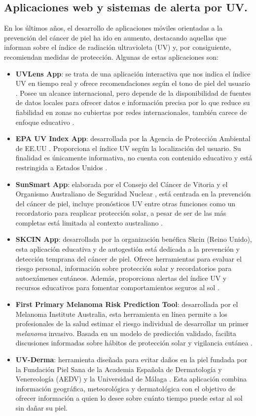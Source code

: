 \subsection{Aplicaciones web y sistemas de alerta por UV.}
En los últimos años, el desarrollo de aplicaciones móviles orientadas a la prevención del cáncer de piel ha ido en aumento, destacando aquellas que informan sobre el índice de radiación ultravioleta (UV) y, por consiguiente, recomiendan medidas de protección.
Algunas de estas aplicaciones son:
\begin{itemize}
    \item \textbf{UVLens App}:  se trata de una aplicación interactiva que nos indica el índice UV en tiempo real y ofrece recomendaciones según el tono de piel del usuario \cite{UVLensKeepingYou}. Posee un alcance internacional, pero depende de la disponibilidad de fuentes de datos locales para ofrecer datos e información precisa por lo que reduce su fiabilidad en zonas no cubiertas por redes internacionales, también carece de enfoque educativo .
    \item \textbf{EPA UV Index App}: desarrollada por la Agencia de Protección Ambiental de EE.UU \cite{usepaUSEnvironmentalProtection2013}. Proporciona el índice UV según la localización del usuario. Su finalidad es únicamente informativa, no cuenta con contenido educativo y está restringida a Estados Unidos  \cite{usepaUVIndex2023}.
    \item \textbf{SunSmart App}: elaborada por el Consejo del Cáncer de Vitoria y el Organismo Australiano de Seguridad Nuclear \cite{AplicacionSunSmartGlobal}, está centrada en la prevención del cáncer de piel, incluye pronósticos UV entre otras funciones como un recordatorio para reaplicar protección solar, a pesar de ser de las más completas está limitada al contexto australiano \cite{sunsmartHomePageMeta}.
    \item \textbf{SKCIN App}: desarrollada por la organización benéfica Skcin (Reino Unido), esta aplicación educativa y de autogestión está dedicada a la prevención y detección temprana del cáncer de piel. Ofrece herramientas para evaluar el riesgo personal, información sobre protección solar y recordatorios para autoexámenes cutáneos. Además, proporciona alertas del índice UV y recursos educativos para fomentar comportamientos seguros al sol \cite{SkcinApp}.
    \item \textbf{ First Primary Melanoma Risk Prediction Tool}: desarrollada por el Melanoma Institute Australia, esta herramienta en línea permite a los profesionales de la salud estimar el riesgo individual de desarrollar un primer \textit{melanoma} invasivo. Basada en un modelo de predicción validado, facilita discusiones informadas sobre hábitos de protección solar y vigilancia cutánea \cite{MelanomaRiskAssessment}.
    \item \textbf{UV-Derma}: herramienta diseñada para evitar daños en la piel fundada por la Fundación Piel Sana de la Academia Española de Dermatología y Venereología (AEDV) y la Universidad de Málaga \cite{fpsUVDermaAppQue2021}. Esta aplicación combina información geográfica, meteorológica y dermatológica con el objetivo de ofrecer información a quien lo desee sobre cuánto tiempo puede estar al sol sin dañar su piel.
\end{itemize}
